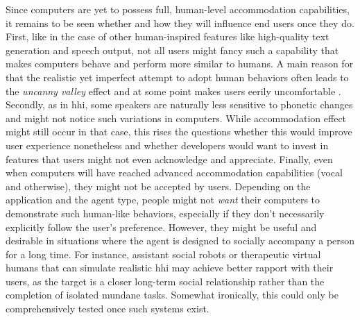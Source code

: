 Since computers are yet to possess full, human-level accommodation capabilities, it remains to be seen whether and how they will influence end users once they do.
First, like in the case of other human-inspired features like high-quality text generation and speech output, not all users might fancy such a capability that makes computers behave and perform more similar to humans.
A main reason for that the realistic yet imperfect attempt to adopt human behaviors often leads to the \emph{uncanny valley} effect \citep{Mori1970uncanny} and at some point makes users eerily uncomfortable \citep[cf.\ Figure 1 in][]{Macdorman2006subjective}.
Secondly, as in \ac{hhi}, some speakers are naturally less sensitive to phonetic changes and might not notice such variations in computers.
While accommodation effect might still occur in that case, this rises the questions whether this would improve user experience nonetheless and whether developers would want to invest in features that users might not even acknowledge and appreciate.
Finally, even when computers will have reached advanced accommodation capabilities (vocal and otherwise), they might not be accepted by users.
Depending on the application and the agent type, people might not \emph{want} their computers to demonstrate such human-like behaviors, especially if they don't necessarily explicitly follow the user's preference.
However, they might be useful and desirable in situations where the agent is designed to socially accompany a person for a long time.
For instance, assistant social robots or therapeutic virtual humans that can simulate realistic \ac{hhi} may achieve better rapport with their users, as the target is a closer long-term social relationship rather than the completion of isolated mundane tasks.
Somewhat ironically, this could only be comprehensively tested once such systems exist.


